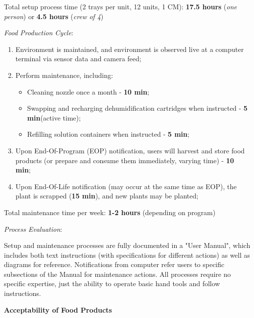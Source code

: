 \documentclass{report}
\begin{document}
Total setup process time (2 trays per unit, 12 units, 1 CM): \textbf{17.5 hours} (\textit{one person}) or \textbf{4.5 hours} (\textit{crew of 4})

\textit{Food Production Cycle}:

\begin{enumerate}
    \item Environment is maintained, and environment is observed live at a computer terminal via sensor data and camera feed;
    \item Perform maintenance, including:
    \begin{itemize}
        \item Cleaning nozzle once a month - \textbf{10 min}\footnotemark[3];
        \item Swapping and recharging dehumidification cartridges when instructed - \textbf{5 min}\footnotemark[2] (active time);
        \item Refilling solution containers when instructed - \textbf{5 min}\footnotemark[2];
    \end{itemize}
    \item Upon End-Of-Program (EOP) notification, users will harvest and store food products (or prepare and consume them immediately, varying time) - \textbf{10 min}\footnotemark[1];
    \item Upon End-Of-Life notification (may occur at the same time as EOP), the plant is scrapped (\textbf{15 min}), and new plants may be planted;
\end{enumerate}

Total maintenance time per week: \textbf{1-2 hours} (depending on program)

\textit{Process Evaluation}:

Setup and maintenance processes are fully documented in a "User Manual", which includes both text instructions (with specifications for different actions) as well as diagrams for reference. Notifications from computer refer users to specific subsections of the Manual for maintenance actions. All processes require no specific expertise, just the ability to operate basic hand tools and follow instructions.

\textbf{Acceptability of Food Products}
\label{sec:acceptability-products}

\end{document}
